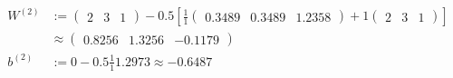 \begin{enumerate}
\begin{align*}
W^{(2)} &:= \begin{pmatrix} 2 & 3 & 1 \end{pmatrix} - 0.5 \left[\frac{1}{1} \begin{pmatrix} 0.3489 & 0.3489 & 1.2358 \end{pmatrix} + 1 \begin{pmatrix} 2 & 3 & 1 \end{pmatrix}\right] \\
&\approx \begin{pmatrix} 0.8256 & 1.3256 & -0.1179 \end{pmatrix} \\
b^{(2)} &:= 0 - 0.5 \frac{1}{1} 1.2973 \approx -0.6487
\end{align*}
\end{enumerate}
